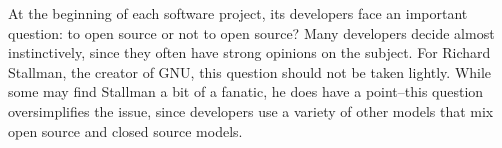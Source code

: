 At the beginning of each software project, its developers face an important
question: to open source or not to open source? Many developers decide almost
instinctively, since they often have strong opinions on the subject. For Richard
Stallman, the creator of GNU, this question should not be taken lightly. While some
may find Stallman a bit of a fanatic, he does have a point--this
question oversimplifies the issue, since developers use a variety of other
models that mix open source and closed source models.
